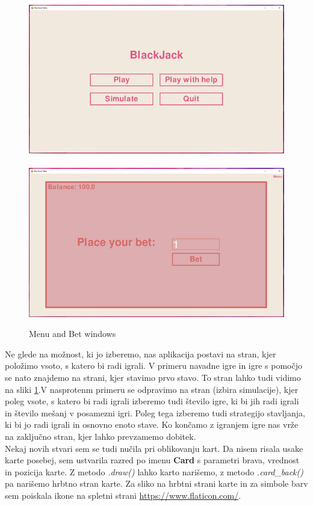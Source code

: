 \documentclass[a4paper, 16pt]{article}
\begin{document}
\begin{figure}[htbp]
\centering
{}
\includegraphics{meni.png}\,%
\includegraphics{bet.png}
\caption{Menu and Bet windows}
\label{fig:menu}
 \end{figure}


Ne glede na možnost, ki jo izberemo, nas aplikacija postavi na stran, kjer položimo vsoto, s katero bi radi igrali. V primeru navadne igre in igre s pomočjo se nato znajdemo na strani, kjer stavimo prvo stavo. To stran lahko tudi vidimo na sliki \ref{fig:menu}.V nasprotenm primeru se odpravimo na stran (izbira simulacije), kjer poleg vsote, s katero bi radi igrali izberemo tudi število igre, ki bi jih radi igrali in število mešanj v posamezni igri. Poleg tega izberemo tudi strategijo stavljanja, ki bi jo radi igrali in osnovno enoto stave.
Ko končamo z igranjem igre nas vrže na zaključno stran, kjer lahko prevzamemo dobitek. \\

Nekaj novih stvari sem se tudi nučila pri oblikovanju kart. Da nisem risala usake karte posebej, sem ustvarila razred po imenu \textbf{Card} s parametri brava, vrednost in pozicija karte. Z metodo \textit{.draw()} lahko karto narišemo, z metodo \textit{.card\_back()} pa narišemo hrbtno stran karte. Za sliko na hrbtni strani karte in za simbole barv sem poiskala ikone na spletni strani \url{https://www.flaticon.com/}.
\end{document}
